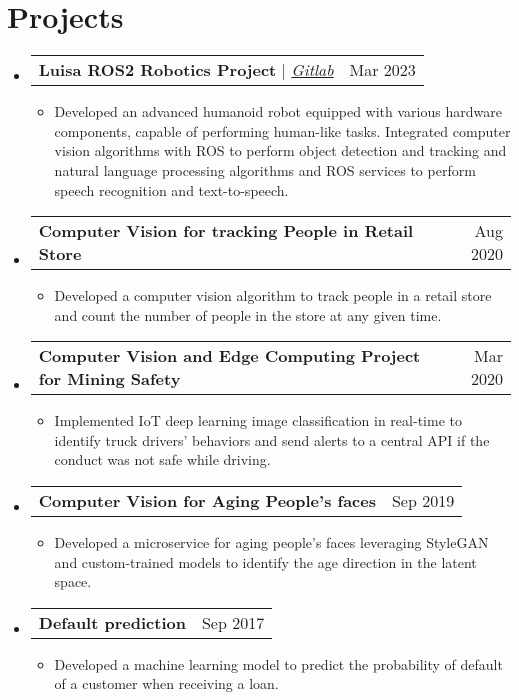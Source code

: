 \documentclass[letterpaper,11pt]{article}
\makeatletter
\newcommand{\resumeItem}[1]{
  \item\small{
    {#1 \vspace{-2pt}}
  }
}
\newcommand{\resumeProjectHeading}[2]{
  \vspace{-2pt}\item
  \begin{tabular*}{0.97\textwidth}{l@{\extracolsep{\fill}}r}
    \small#1 & #2 \\
  \end{tabular*}\vspace{-7pt}
}
\newcommand{\resumeSubHeadingListStart}{\begin{itemize}[leftmargin=0.15in, label={}]}
\newcommand{\resumeSubHeadingListEnd}{\end{itemize}}
\newcommand{\resumeItemListStart}{\begin{itemize}}
\newcommand{\resumeItemListEnd}{\end{itemize}\vspace{-5pt}}
\makeatother
\begin{document}
\section*{Projects}
    \vspace{3pt}
    \resumeSubHeadingListStart
        \resumeProjectHeading
            {\textbf{Luisa ROS2 Robotics Project} $|$ \emph{\href{https://gitlab.com/gaitan.ignacio/luisa-robot}{\color{blue}Gitlab}}}{Mar 2023}
            \resumeItemListStart
                \resumeItem{Developed an advanced humanoid robot equipped with various hardware components, capable of performing human-like tasks.
                Integrated computer vision algorithms with ROS to perform object detection and tracking and natural language processing algorithms and ROS services to perform speech recognition and text-to-speech.}
            \resumeItemListEnd
        \resumeProjectHeading
            {\textbf{Computer Vision for tracking People in Retail Store}}{Aug 2020}
            \resumeItemListStart
                \resumeItem{Developed a computer vision algorithm to track people in a retail store and count the number of people in the store at any given time.}
            \resumeItemListEnd
        \resumeProjectHeading
            {\textbf{Computer Vision and Edge Computing Project for Mining Safety}}{Mar 2020}
            \resumeItemListStart
                \resumeItem{Implemented IoT deep learning image classification in real-time to identify truck drivers' behaviors and send alerts to a central API if the conduct was not safe while driving.}
            \resumeItemListEnd
        \resumeProjectHeading
            {\textbf{Computer Vision for Aging People’s faces}}{Sep 2019}
            \resumeItemListStart
            \resumeItem{Developed a microservice for aging people's faces leveraging StyleGAN and custom-trained models to identify the age direction in the latent space.}
            \resumeItemListEnd
        \resumeProjectHeading
            {\textbf{Default prediction}}{Sep 2017}
            \resumeItemListStart
                \resumeItem{Developed a machine learning model to predict the probability of default of a customer when receiving a loan.}
            \resumeItemListEnd
    \resumeSubHeadingListEnd
\end{document}
